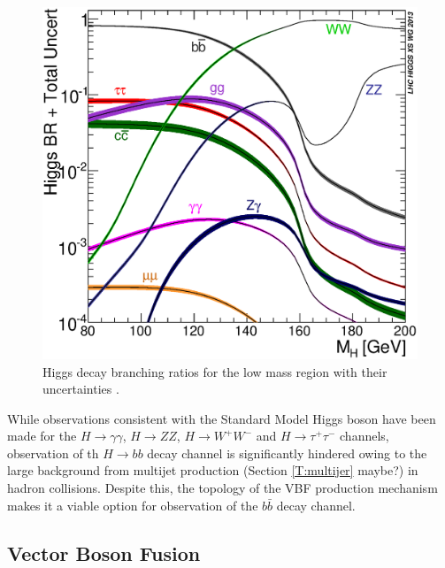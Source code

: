 		\begin{figure}[h]
			\centering
			\includegraphics[width=0.5\linewidth]{T/FIGS/Higgs_BR_LM}
			\caption{Higgs decay branching ratios for the low mass region with their uncertainties \cite{LHCHiggsXS2013}.}
			\label{fig:higgsbrlm}
		\end{figure}
		
		While observations consistent with the Standard Model Higgs boson have been made for the $H\rightarrow \gamma\gamma$, $H\rightarrow ZZ$, $H\rightarrow W^+W^-$ and $H\rightarrow \tau^+\tau^-$ channels, observation of th $H\rightarrow bb$ decay channel is significantly hindered owing to the large background from multijet production (Section \ref{T:multijer} maybe?) in hadron collisions. Despite this, the topology of the VBF production mechanism makes it a viable option for observation of the  $b\bar{b}$ decay channel.

	
	\subsection{Vector Boson Fusion}
	
	
	
	
\endinput
